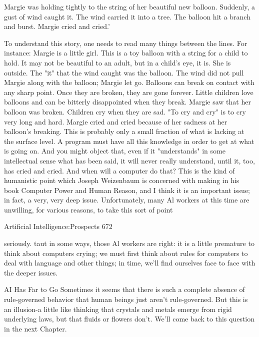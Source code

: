     Margie was holding tightly to the string of her beautiful new balloon. Suddenly, a
    gust of wind caught it. The wind carried it into a tree. The balloon hit a branch
    and burst. Margie cried and cried.'

To understand this story, one needs to read many things between the lines. For instance:
Margie is a little girl. This is a toy balloon with a string for a child to hold. It may not be
beautiful to an adult, but in a child's eye, it is. She is outside. The "it" that the wind
caught was the balloon. The wind did not pull Margie along with the balloon; Margie let
go. Balloons can break on contact with any sharp point. Once they are broken, they are
gone forever. Little children love balloons and can be bitterly disappointed when they
break. Margie saw that her balloon was broken. Children cry when they are sad. "To cry
and cry" is to cry very long and hard. Margie cried and cried because of her sadness at
her balloon's breaking.
        This is probably only a small fraction of what is lacking at the surface level. A
program must have all this knowledge in order to get at what is going on. And you might
object that, even if it "understands" in some intellectual sense what has been said, it will
never really understand, until it, too, has cried and cried. And when will a computer do
that? This is the kind of humanistic point which Joseph Weizenbaum is concerned with
making in his book Computer Power and Human Reason, and I think it is an important
issue; in fact, a very, very deep issue. Unfortunately, many Al workers at this time are
unwilling, for various reasons, to take this sort of point




Artificial Intelligence:Prospects                                                          672

seriously. taut in some ways, those Al workers are right: it is a little premature to think
about computers crying; we must first think about rules for computers to deal with
language and other things; in time, we'll find ourselves face to face with the deeper
issues.

                                    AI Has Far to Go
Sometimes it seems that there is such a complete absence of rule-governed behavior that
human beings just aren't rule-governed. But this is an illusion-a little like thinking that
crystals and metals emerge from rigid underlying laws, but that fluids or flowers don't.
We'll come back to this question in the next Chapter.

